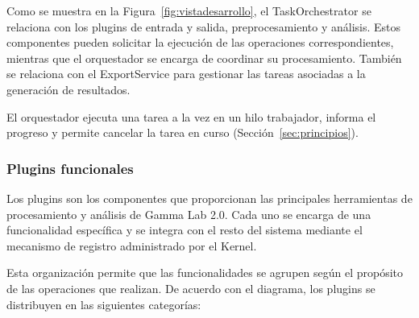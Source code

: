 \documentclass[11pt,a4paper]{article}
\DeclareRobustCommand{\_}{\textunderscore\allowbreak}
\begin{document}
Como se muestra en la Figura~\ref{fig:vistadesarrollo}, el TaskOrchestrator se relaciona con los plugins de entrada y salida, preprocesamiento y análisis. Estos componentes pueden solicitar la ejecución de las operaciones correspondientes, mientras que el orquestador se encarga de coordinar su procesamiento. También se relaciona con el ExportService para gestionar las tareas asociadas a la generación de resultados.

El orquestador ejecuta una tarea a la vez en un hilo trabajador, informa el progreso y permite cancelar la tarea en curso (Sección~\ref{sec:principios}).

\subsubsection{Plugins funcionales}

Los plugins son los componentes que proporcionan las principales herramientas de procesamiento y análisis de Gamma Lab 2.0. Cada uno se encarga de una funcionalidad específica y se integra con el resto del sistema mediante el mecanismo de registro administrado por el Kernel.

Esta organización permite que las funcionalidades se agrupen según el propósito de las operaciones que realizan. De acuerdo con el diagrama, los plugins se distribuyen en las siguientes categorías:
\end{document}

